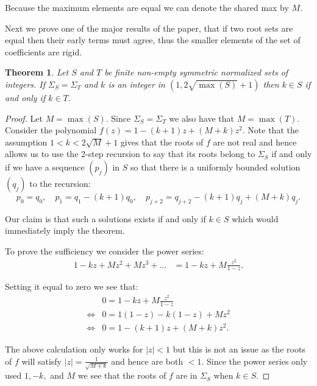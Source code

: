 \documentclass[11pt]{amsart}
\newtheorem{theorem}{Theorem}
\numberwithin{theorem}{section} %
\numberwithin{corollary}{section}
\numberwithin{lemma}{section}
\numberwithin{proposition}{section}
\numberwithin{definition}{section}
\begin{document}
Because the maximum elements are equal we can denote the shared max by $M$.

Next we prove one of the major results of the paper, that if two root sets are equal then their early terms must agree, thus the smaller elements of the set of coefficients are rigid. 

\begin{theorem}
\label{weakrigidity}
Let $S$ and $T$ be finite non-empty symmetric normalized sets of integers. If $\Sigma_S = \Sigma_T$ and $k$ is an integer in $(1, 2\sqrt{\max(S)}+1)$ then $k\in S$ if and only if $k \in T$.
\end{theorem}

\begin{proof}
Let $M = \max(S)$. Since $\Sigma_S = \Sigma_T$ we also have that $M = \max(T)$. Consider the polynomial $f(z) = 1 - (k+1)z + (M+k)z^2$. Note that the assumption $1 < k < 2 \sqrt{M}+1$ gives that the roots of $f$ are not real and hence allows us to use the 2-step recursion to say that its roots belong to $\Sigma_S$ if and only if we have a sequence $(p_j)$ in $S$ so that there is a uniformly bounded solution $(q_j)$ to the recursion:
\begin{equation}
\label{rec2}
p_0 = q_0, \quad p_1 = q_1 - (k+1)q_0, \quad p_{j+2} = q_{j+2} - (k+1)q_j + (M+k)q_j.
\end{equation}

Our claim is that such a solutions exists if and only if $k \in S$ which would immediately imply the theorem.

To prove the sufficiency we consider the power series:
\begin{align*}
1 - kz + Mz^2 + Mz^3 + ... &= 1 - kz + M\frac{z^2}{1-z}.
\end{align*}

Setting it equal to zero we see that:
\begin{align*}
& 0 = 1 - kz + M\frac{z^2}{1-z} \\
\iff & 0 = 1(1-z) - k(1-z) + Mz^2 \\
\iff & 0 = 1 - (k+1)z + (M+k)z^2.
\end{align*}

The above calculation only works for $|z| < 1$ but this is not an issue as the roots of $f$ will satisfy $|z| = \frac{1}{\sqrt{M+k}}$ and hence are both $< 1$. Since the power series only used $1, -k,$ and $M$ we see that the roots of $f$ are in $\Sigma_S$ when $k \in S$.

\bigskip
\bigskip


\end{proof}
\end{document}
